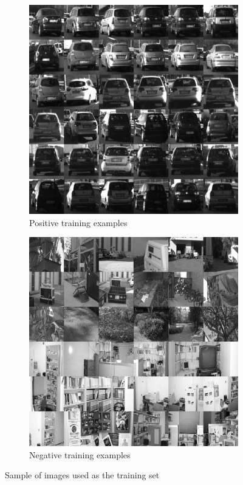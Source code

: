 \begin{figure}[t]
\begin{subfigure}[b]{0.5\textwidth}
\centering
\includegraphics[width=0.85\linewidth]{img/positives.png}
\caption{Positive training examples}
\end{subfigure}
\begin{subfigure}[b]{0.5\textwidth}
\centering
\includegraphics[width=0.85\linewidth]{img/negatives.png}
\caption{Negative training examples}
\end{subfigure}
\caption{Sample of images used as the training set}
\label{fig:dataset}
\end{figure}

